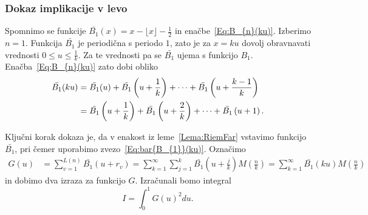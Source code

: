 \documentclass[mat1]{fmfdelo}
\begin{document}
\subsubsection{Dokaz implikacije v levo}
Spomnimo se funkcije $ \bar{B_{1}}(x) = x - \lfloor x \rfloor - \frac{1}{2} $ in enačbe~\eqref{Eq:B_{n}(ku)}. Izberimo $n=1$. Funkcija $\bar{B_{1}}$ je periodična s periodo $1$, zato je za $x=ku$ dovolj obravnavati vrednosti $0 \leq u \leq \frac{1}{k}$. Za te vrednosti pa se $\bar{B_{1}}$ ujema s funkcijo $B_{1}$. Enačba~\eqref{Eq:B_{n}(ku)} zato dobi obliko
\begin{align}
\label{Eq:bar{B_{1}}(ku)}
\bar{B_{1}}(ku) &= \bar{B_{1}}(u) + \bar{B_{1}} \left( u + \frac{1}{k} \right) + \cdots + \bar{B_{1}} \left( u + \frac{k-1}{k} \right) \nonumber \\
			&= \bar{B_{1}} \left( u + \frac{1}{k} \right) + \bar{B_{1}} \left( u + \frac{2}{k} \right) + \cdots + \bar{B_{1}} \left( u + 1 \right).
\end{align}

Ključni korak dokaza je, da v enakost iz leme~\ref{Lema:RiemFar} vstavimo funkcijo $ \bar{B_{1}}$, pri čemer uporabimo zvezo~\eqref{Eq:bar{B_{1}}(ku)}. Označimo
\begin{align}
G(u) &= \sum_{v=1}^{L(n)} \bar{B_{1}}(u+r_v) = \sum_{k=1}^{\infty} \sum_{j=1}^{k} \bar{B_{1}} \left(u + \frac{j}{k} \right) M \left(\frac{n}{k} \right)
	= \sum_{k=1}^{\infty} \bar{B_{1}}(ku) M \left(\frac{n}{k} \right)
\end{align}
in dobimo dva izraza za funkcijo $G$. Izračunali bomo integral 
\begin{equation}
I = \int_{0}^1 G(u)^2 du.
\end{equation}
\end{document}
